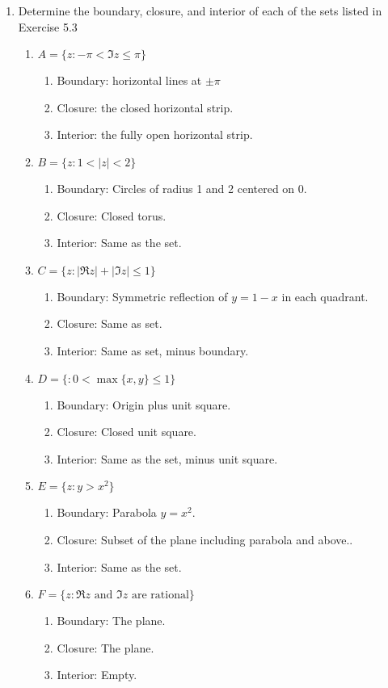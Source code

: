 \documentclass[11pt, a4paper, latinreim, shortsets]{notes}
\begin{document}
\begin{enumerate}[label={\bfseries II.5.\arabic*}]
	\item Determine the boundary, closure, and interior of each of the sets listed in Exercise 5.3

	\begin{enumerate}[label=(\roman*)]
		\item $A = \{z : -\pi < \Im z \leq \pi \}$
			\begin{enumerate}
				\item[] Boundary: horizontal lines at $\pm\pi$
				\item[] Closure: the closed horizontal strip.
				\item[] Interior: the fully open horizontal strip.
			\end{enumerate}
		\item $B = \{ z : 1 < |z| < 2\}$
			\begin{enumerate}
				\item[] Boundary: Circles of radius 1 and 2 centered on 0.
				\item[] Closure: Closed torus.
				\item[] Interior: Same as the set.
			\end{enumerate}
		\item $C = \{ z : |\Re z| + |\Im z| \leq 1\}$
			\begin{enumerate}
				\item[] Boundary: Symmetric reflection of $y=1-x$ in each quadrant.
				\item[] Closure: Same as set.
				\item[] Interior: Same as set, minus boundary.
			\end{enumerate}
		\item $D = \{ : 0 < \max\{x,y\} \leq 1\}$
			\begin{enumerate}
				\item[] Boundary: Origin plus unit square.
				\item[] Closure: Closed unit square.
				\item[] Interior: Same as the set, minus unit square.
			\end{enumerate}
		\item $E = \{z : y > x^2 \}$
			\begin{enumerate}
				\item[] Boundary: Parabola $y=x^2$.
				\item[] Closure: Subset of the plane including parabola and above..
				\item[] Interior: Same as the set.
			\end{enumerate}
		\item $F = \{z : \Re z \text{ and } \Im z \text{ are rational}\}$
			\begin{enumerate}
				\item[] Boundary: The plane.
				\item[] Closure: The plane.
				\item[] Interior: Empty.
			\end{enumerate}
	\end{enumerate}


\end{enumerate}
\end{document}
